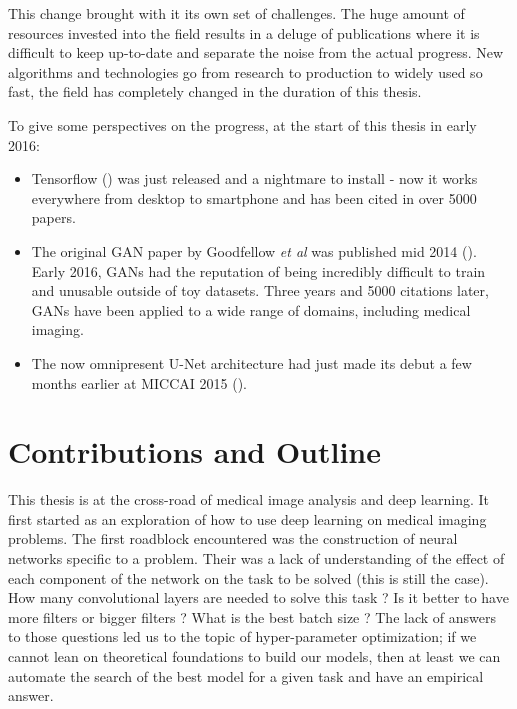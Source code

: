 This change brought with it its own set of challenges. The huge amount of resources invested into the field results in a deluge of publications where it is difficult to keep up-to-date and separate the noise from the actual progress. New algorithms and technologies go from research to production to widely used so fast, the field has completely changed in the duration of this thesis.

To give some perspectives on the progress, at the start of this thesis in early 2016: 
\begin{itemize}
    \item Tensorflow (\textcite{tensorflow2015}) was just released and a nightmare to install - now it works everywhere from desktop to smartphone and has been cited in over 5000 papers.
    \item The original GAN paper by Goodfellow \textit{et al} was published mid 2014 (\textcite{goodfellow2014}). Early 2016, GANs had the reputation of being incredibly difficult to train and unusable outside of toy datasets. Three years and 5000 citations later, GANs have been applied to a wide range of domains, including medical imaging.
    \item The now omnipresent U-Net architecture had just made its debut a few months earlier at MICCAI 2015 (\textcite{ronneberger2015MICCAI}).
\end{itemize}


\section{Contributions and Outline}

This thesis is at the cross-road of medical image analysis and deep learning. It first started as an exploration of how to use deep learning on medical imaging problems. The first roadblock encountered was the construction of neural networks specific to a problem. Their was a lack of understanding of the effect of each component of the network on the task to be solved (this is still the case). How many convolutional layers are needed to solve this task ? Is it better to have more filters or bigger filters ? What is the best batch size ? The lack of answers to those questions led us to the topic of hyper-parameter optimization; if we cannot lean on theoretical foundations to build our models, then at least we can automate the search of the best model for a given task and have an empirical answer.

